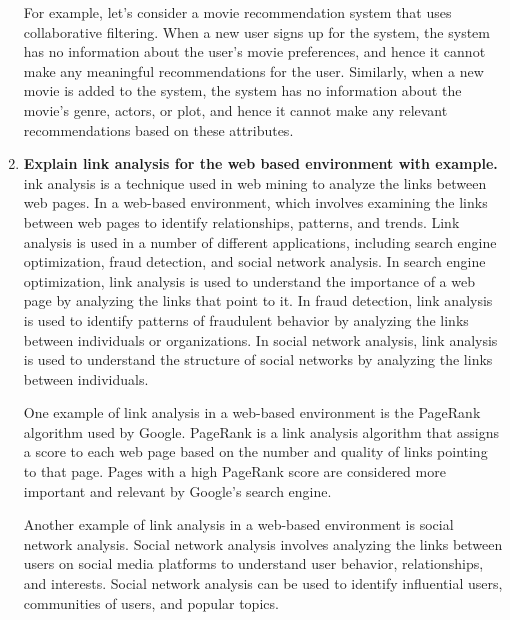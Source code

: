 \documentclass[12pt]{article}
\begin{document}
\begin{enumerate}
    For example, let's consider a movie recommendation system that uses collaborative filtering. When a new user signs up for the system, the system has no information about the user's movie preferences, and hence it cannot make any meaningful recommendations for the user. Similarly, when a new movie is added to the system, the system has no information about the movie's genre, actors, or plot, and hence it cannot make any relevant recommendations based on these attributes.
\item {\bfseries Explain link analysis for the web based environment with example.\\}
ink analysis is a technique used in web mining to analyze the links between web pages. In a web-based environment, which involves examining the links between web pages to identify relationships, patterns, and trends. Link analysis is used in a number of different applications, including search engine optimization, fraud detection, and social network analysis. In search engine optimization, link analysis is used to understand the importance of a web page by analyzing the links that point to it. In fraud detection, link analysis is used to identify patterns of fraudulent behavior by analyzing the links between individuals or organizations. In social network analysis, link analysis is used to understand the structure of social networks by analyzing the links between individuals.

One example of link analysis in a web-based environment is the PageRank algorithm used by Google. PageRank is a link analysis algorithm that assigns a score to each web page based on the number and quality of links pointing to that page. Pages with a high PageRank score are considered more important and relevant by Google's search engine.

Another example of link analysis in a web-based environment is social network analysis. Social network analysis involves analyzing the links between users on social media platforms to understand user behavior, relationships, and interests. Social network analysis can be used to identify influential users, communities of users, and popular topics.


\end{enumerate}
\end{document}
